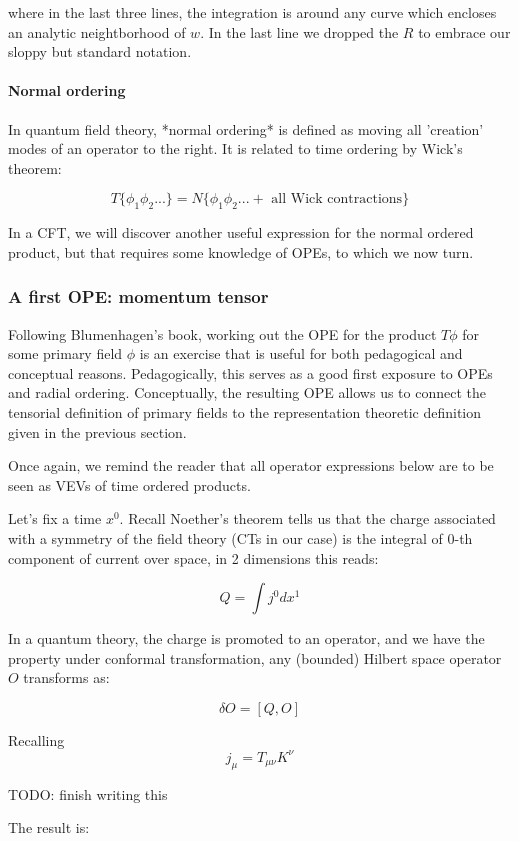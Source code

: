 where in the last three lines, the integration is around any curve which encloses an analytic neightborhood of $w$. In the last line we dropped the $R$ to embrace our sloppy but standard notation.


\paragraph{ Normal ordering}

In quantum field theory, *normal ordering* is defined as moving all 'creation' modes of an operator to the right. It is related to time ordering by Wick's theorem:

$$T\{\phi_1\phi_2...\} = N \{ \phi_1\phi_2... +\text{ all Wick contractions} \}$$

In a CFT, we will discover another useful expression for the normal ordered product, but that requires some knowledge of OPEs, to which we now turn.

\subsubsection{ A first OPE: momentum tensor}
Following Blumenhagen's book, working out the OPE for the product 
$T \phi$ for some primary field $\phi$ is an exercise that is useful for both pedagogical and conceptual reasons. Pedagogically, this serves as a good first exposure to OPEs and radial ordering. Conceptually, the resulting OPE allows us to connect the tensorial definition of primary fields to the representation theoretic definition given in the previous section.

Once again, we remind the reader that all operator expressions below are to be seen as VEVs of time ordered products.

Let's fix a time $x^0$. Recall Noether's theorem tells us that the charge associated with a symmetry of the field theory (CTs in our case) is the integral of 0-th component of current over space, in 2 dimensions this reads:

$$Q = \int j^0 dx^1 $$

In a quantum theory, the charge is promoted to an operator, and we have the property under conformal transformation, any (bounded) Hilbert space operator $O$ transforms as:

$$ \delta O = [ Q, O]$$ 

Recalling
$$j_\mu = T_{\mu\nu} K^\nu$$ 

TODO: finish writing this

The result is:

